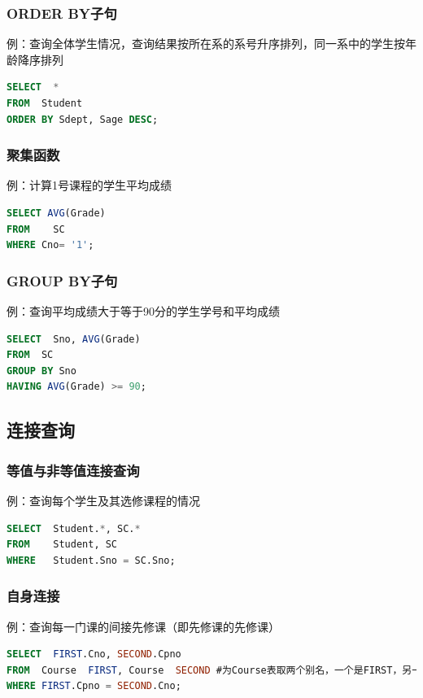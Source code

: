 \subsubsection{ORDER BY子句}
例：查询全体学生情况，查询结果按所在系的系号升序排列，同一系中的学生按年龄降序排列
\begin{lstlisting}[language=sql]
SELECT  *
FROM  Student
ORDER BY Sdept, Sage DESC; 
\end{lstlisting}

\subsubsection{聚集函数}
例：计算1号课程的学生平均成绩
\begin{lstlisting}[language=sql]
SELECT AVG(Grade)
FROM    SC
WHERE Cno= '1';
\end{lstlisting}

\subsubsection{GROUP BY子句}
例：查询平均成绩大于等于90分的学生学号和平均成绩
\begin{lstlisting}[language=sql]
SELECT  Sno, AVG(Grade)
FROM  SC
GROUP BY Sno
HAVING AVG(Grade) >= 90;
\end{lstlisting}

\subsection{连接查询}

\subsubsection{等值与非等值连接查询}
例：查询每个学生及其选修课程的情况
\begin{lstlisting}[language=sql]
SELECT  Student.*, SC.*
FROM    Student, SC
WHERE   Student.Sno = SC.Sno;
\end{lstlisting}

\subsubsection{自身连接}
例：查询每一门课的间接先修课（即先修课的先修课）
\begin{lstlisting}[language=sql]
SELECT  FIRST.Cno, SECOND.Cpno
FROM  Course  FIRST, Course  SECOND #为Course表取两个别名，一个是FIRST，另一个是SECOND
WHERE FIRST.Cpno = SECOND.Cno;
\end{lstlisting}

